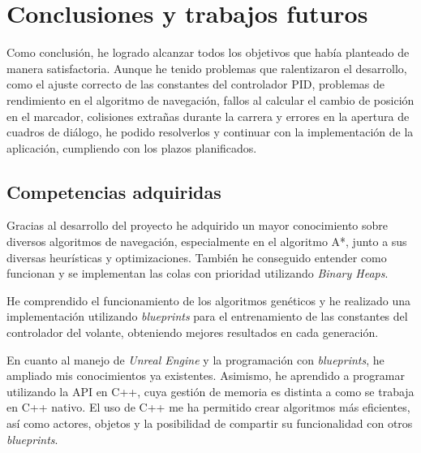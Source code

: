 

\chapter{Conclusiones y trabajos futuros}
Como conclusión, he logrado alcanzar todos los objetivos que había planteado de manera satisfactoria. Aunque he tenido problemas que ralentizaron el desarrollo, como el ajuste correcto de las constantes del controlador PID, problemas de rendimiento en el algoritmo de navegación, fallos al calcular el cambio de posición en el marcador, colisiones extrañas durante la carrera y errores en la apertura de cuadros de diálogo, he podido resolverlos y continuar con la implementación de la aplicación, cumpliendo con los plazos planificados.


\section{Competencias adquiridas}

Gracias al desarrollo del proyecto he adquirido un mayor conocimiento sobre diversos algoritmos de navegación, especialmente en el algoritmo A*, junto a sus diversas heurísticas y optimizaciones. También he conseguido entender como funcionan y se implementan las colas con prioridad utilizando \textit{Binary Heaps}.

\bigskip
 
He comprendido el funcionamiento de los algoritmos genéticos y he realizado una implementación utilizando \textit{blueprints} para el entrenamiento de las constantes del controlador del volante, obteniendo mejores resultados en cada generación.

\bigskip


En cuanto al manejo de \textit{Unreal Engine} y la programación con \textit{blueprints}, he ampliado mis conocimientos ya existentes.
Asimismo, he aprendido a programar utilizando la API en C++, cuya gestión de memoria es distinta a como se trabaja en C++ nativo. El uso de C++ me ha permitido crear algoritmos más eficientes, así como actores, objetos y la posibilidad de compartir su funcionalidad con otros \textit{blueprints}.

